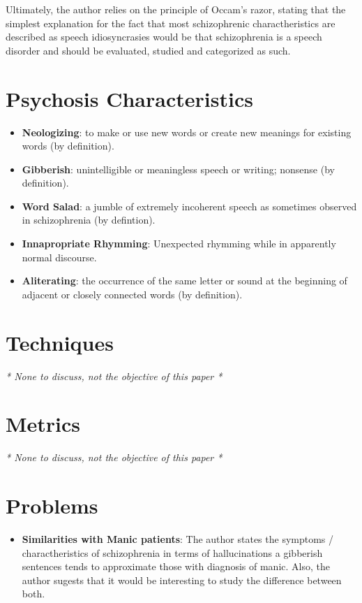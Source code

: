\documentclass{Paper_Summary}
\begin{document}
    Ultimately, the author relies on the principle of Occam's razor, stating that the simplest explanation for the fact that most schizophrenic charactheristics are described as speech idiosyncrasies would be that schizophrenia is a speech disorder and should be evaluated, studied and categorized as such.

\breakline

\newpage

\section{Psychosis Characteristics}
    \begin{itemize}
        \item \textbf{Neologizing}: to make or use new words or create new meanings for existing words (by definition).
        \item \textbf{Gibberish}: unintelligible or meaningless speech or writing; nonsense (by definition).
        \item \textbf{Word Salad}: a jumble of extremely incoherent speech as sometimes observed in schizophrenia (by defintion).
        \item \textbf{Innapropriate Rhymming}: Unexpected rhymming while in apparently normal discourse.
        \item \textbf{Aliterating}: the occurrence of the same letter or sound at the beginning of adjacent or closely connected words (by definition).
    \end{itemize}

\section{Techniques}
    \emph{* None to discuss, not the objective of this paper *}

\section{Metrics}
    \emph{* None to discuss, not the objective of this paper *}

\section{Problems}
    \begin{itemize}
        \item \textbf{Similarities with Manic patients}: The author states the symptoms / charactheristics of schizophrenia in terms of hallucinations a gibberish sentences tends to approximate those with diagnosis of manic. Also, the author sugests that it would be interesting to study the difference between both.
    \end{itemize}
\end{document}
